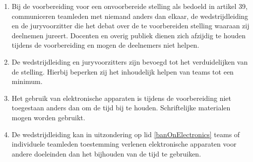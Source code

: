 
\begin{enumerate}
\item Bij de voorbereiding voor een onvoorbereide stelling als bedoeld in artikel 39, communiceren teamleden met niemand anders dan elkaar, de wedstrijdleiding en de juryvoorzitter die het debat over de te voorbereiden stelling waaraan zij deelnemen jureert. Docenten en overig publiek dienen zich afzijdig te houden tijdens de voorbereiding en mogen de deelnemers niet helpen. 
\item De wedstrijdleiding en juryvoorzitters zijn bevoegd tot het verduidelijken van de stelling. Hierbij beperken zij het inhoudelijk helpen van teams tot een minimum. 
\item \label{banOnElectronics} Het gebruik van elektronische apparaten is tijdens de voorbereiding niet toegestaan anders dan om de tijd bij te houden. Schriftelijke materialen mogen worden gebruikt. 
\item De wedstrijdleiding kan in uitzondering op lid \ref{banOnElectronics} teams of individuele teamleden toestemming verlenen elektronische apparaten voor andere doeleinden dan het bijhouden van de tijd te gebruiken. 
\end{enumerate}
